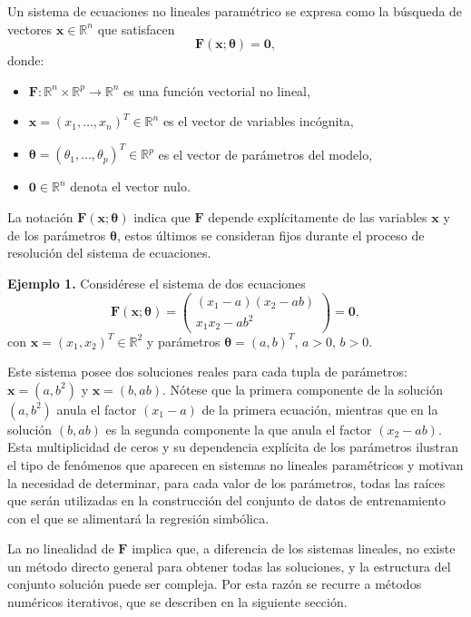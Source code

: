 \documentclass{article}
\newcommand{\xvec}{\mathbf{x}}
\newcommand{\thetavec}{\boldsymbol{\theta}}
\newcommand{\Fvec}{\mathbf{F}}
\newcommand{\R}{\mathbb{R}}
\begin{document}
Un sistema de ecuaciones no lineales paramétrico se expresa como la
búsqueda de vectores \(\xvec \in \R^n\) que satisfacen
\begin{equation}
\Fvec(\xvec; \thetavec) = \mathbf{0},
\label{eq:sistema_general}
\end{equation}
donde:
\begin{itemize}
    \item \(\Fvec: \R^n \times \R^p \to \R^n\) es una función vectorial
          no lineal,
    \item \(\xvec = (x_1, \dots, x_n)^T \in \R^n\) es el vector de
          variables incógnita,
    \item \(\thetavec = (\theta_1, \dots, \theta_p)^T \in \R^p\) es el
          vector de parámetros del modelo,
    \item \(\mathbf{0} \in \R^n\) denota el vector nulo.
\end{itemize}
La notación \(\Fvec(\xvec; \thetavec)\) indica que \(\Fvec\) depende
explícitamente de las variables \(\xvec\) y de los parámetros
\(\thetavec\), estos últimos se consideran fijos durante el proceso de
resolución del sistema de ecuaciones.

\noindent\textbf{Ejemplo 1.} Considérese el sistema de dos ecuaciones
\[
\Fvec(\xvec; \thetavec) = 
\begin{pmatrix}
(x_1 - a)(x_2 - ab) \\[2pt] x_1 x_2 - a b^2
\end{pmatrix}
= \mathbf{0},
\]
con \(\xvec = (x_1, x_2)^T \in \R^2\) y parámetros
\(\thetavec = (a, b)^T\), \(a > 0\), \(b > 0\).

Este sistema posee dos soluciones reales para cada tupla de
parámetros: \(\xvec = (a, b^2)\) y \(\xvec = (b, ab)\). Nótese que la
primera componente de la solución \((a, b^2)\) anula el factor
\((x_1 - a)\) de la primera ecuación, mientras que en la solución
\((b, ab)\) es la segunda componente la que anula el factor
\((x_2 - ab)\). Esta multiplicidad de ceros y su dependencia explícita
de los parámetros ilustran el tipo de fenómenos que aparecen en
sistemas no lineales paramétricos y motivan la necesidad de
determinar, para cada valor de los parámetros, todas las raíces que
serán utilizadas en la construcción del conjunto de datos de
entrenamiento con el que se alimentará la regresión simbólica.

La no linealidad de \(\Fvec\) implica que, a diferencia de los sistemas
lineales, no existe un método directo general para obtener todas las
soluciones, y la estructura del conjunto solución puede ser compleja.
Por esta razón se recurre a métodos numéricos iterativos, que se
describen en la siguiente sección.
\end{document}
